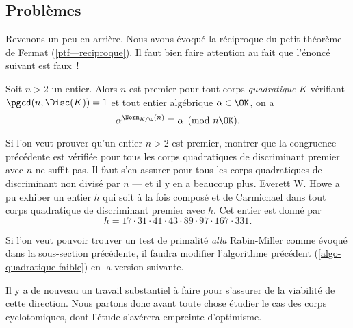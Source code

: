 \subsection{Problèmes }

Revenons un peu en arrière. Nous avons évoqué la réciproque du petit théorème de Fermat (\ref{ptf—reciproque}). Il faut bien faire attention au fait que l'énoncé suivant est faux~!

\begin{enoncefaux}
	Soit $n>2$ un entier. Alors $n$ est premier \ssi pour tout corps \emph{quadratique} $K$ vérifiant $\pgcd(n, \Disc(K)) = 1$ et tout entier algébrique $\alpha \in \OK$, on a $$\alpha^{\Norm_{K/\Q}(n)} \equiv \alpha \pmod{n\OK}.$$
\end{enoncefaux}

Si l'on veut prouver qu'un entier $n>2$ est premier, montrer que la congruence précédente est vérifiée pour tous les corps quadratiques de discriminant premier avec $n$ ne suffit pas. Il faut s'en assurer pour tous les corps quadratiques de discriminant non divisé par $n$ — et il y en a beaucoup plus. Everett W. Howe a pu exhiber un entier $h$ qui soit à la fois composé et de Carmichael dans tout corps quadratique de discriminant premier avec $h$. Cet entier est donné par $$h = 17 \cdot 31 \cdot 41 \cdot 43 \cdot 89 \cdot 97 \cdot 167 \cdot 331.$$

Si l'on veut pouvoir trouver un test de primalité \emph{alla} Rabin-Miller comme évoqué dans la sous-section précédente, il faudra modifier l'algorithme précédent (\ref{algo-quadratique-faible}) en la version suivante.


\vspace{1em}
\begin{algorithm}[H]\label{algo-quadratique-faible}
\end{algorithm}
\vspace{1em}

Il y a de nouveau un travail substantiel à faire pour s'assurer de la viabilité de cette direction. Nous partons donc avant toute chose étudier le cas des corps cyclotomiques, dont l'étude s'avérera empreinte d'optimisme.
